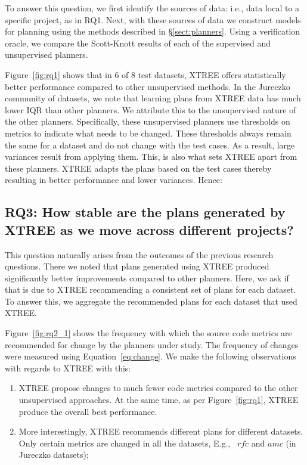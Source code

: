 \documentclass[10pt,journal,compsoc]{IEEEtran}
\newcommand{\be}{\begin{enumerate}}
\newcommand{\ee}{\end{enumerate}}
\newcommand{\tion}[1]{\S\ref{sect:#1}}
\newcommand{\fig}[1]{Figure~\ref{fig:#1}}
\newcommand{\eq}[1]{Equation~\ref{eq:#1}}
\begin{document}
To answer this question, we first identify the sources of data: i.e., data local to a specific project, as in RQ1. Next, with these sources of data we construct models for planning using the methods described in \tion{planners}. Using a verification oracle, we  compare the Scott-Knott results of each of the supervised and unsupervised planners. 

\fig{rq1} shows that in 6 of 8 test datasets, XTREE offers statistically better performance compared to other unsupervised methods. In the Jureczko community of datasets, we note that learning plans from XTREE data has much lower IQR than other planners. We attribute this to the unsupervised nature of the other planners. Specifically, these unsupervised planners use thresholds on metrics to indicate what needs to be changed. These thresholds always remain the same for a dataset and do not change with the test cases. As a result, large variances result from applying them. This, is also what sets XTREE apart from these planners. XTREE adapts the plans based on the test cases thereby resulting in better performance and lower variances. Hence:




\subsection*{{\bf RQ3: How stable are the plans generated by XTREE as we move across different projects?}}

This question naturally arises from the outcomes of the previous research questions. There we noted that plans generated using XTREE produced significantly better improvements compared to other planners. Here, we ask if that is due to XTREE recommending a consistent set of plans for each dataset. To answer this, we aggregate the recommended plans for each dataset that used XTREE.  

Figure~\ref{fig:rq2_1} shows the frequency with which the source code metrics are recommended for change by the planners under study. The frequency of changes were measured using \eq{change}. We make the following observations with regards to XTREE with this: 
\be
\item XTREE propose changes to much fewer code metrics compared to the other unsupervised approaches. At the same time, as per \fig{rq1}, XTREE produce the overall best performance. 
\item More interestingly, XTREE recommends different plans for different datasets. Only certain metrics are changed in all the datasets, E.g., ~$rfc$ and $amc$ (in Jureczko datasets);
\ee
\end{document}

